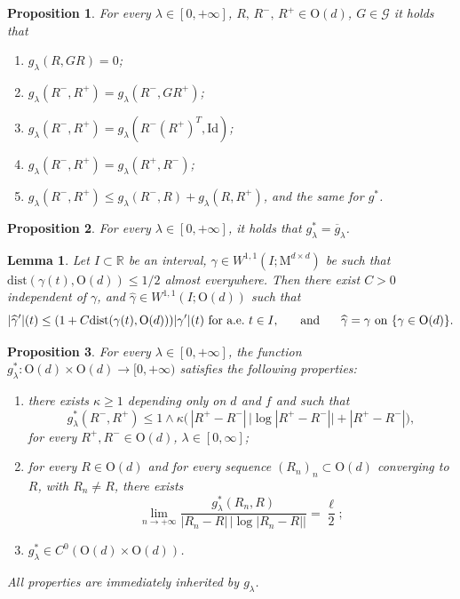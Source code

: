 \documentclass[10pt,a4paper]{amsart}
\newtheorem{proposition}{Proposition}
\newtheorem{lemma}{Lemma}
\newcommand{\G}{\mathcal{G}}
\newcommand\Id{{\mathrm{Id}}}
\newcommand{\Mno}{\mathrm{M}^{d\times d}}
\newcommand{\On}{\mathrm{O}(d)}
\newcommand\R{\mathbb{R}}
\newcommand\dist{{\mathrm{dist}}}
\newcommand{\ol}{\overline}
\begin{document}
\begin{proposition}\label{p:bpg}
For every $\lambda\in [0,+\infty]$,  $R,\,  R^-,\, R^+ \in \On$, $G\in \G$ it holds that 
\begin{enumerate}
	\item\label{p:bpg:0} $g_\lambda(R, GR)=0$;
	\item\label{p:bpg:G} $g_\lambda( R^-, R^+)=g_\lambda( R^-, GR^+)$;
	\item\label{p:bpg:Id} $g_\lambda( R^-, R^+)=g_\lambda( R^-(R^+)^T, \Id)$;
\item\label{p:bpg:sym} $g_\lambda( R^-, R^+)=g_\lambda(R^+, R^-)$;
\item\label{p:bpg:subadd} $g_\lambda( R^-,R^+)
    \le g_\lambda(R^-, R)+g_\lambda(R,R^+)$, and the same for $g^*$.
\end{enumerate}
\end{proposition}

\begin{proposition}\label{le:equivglambda}
For every $\lambda \in[0,+\infty]$, it holds that $g^*_\lambda=\ol g_\lambda$.
\end{proposition}

\begin{lemma}\label{lemmaprojOn}
 Let $I\subset\R$ be an interval, $\gamma\in W^{1,1}(I;\Mno)$ be such that
 $\dist(\gamma(t),\On)\le 1/2$ almost everywhere.
 Then there exist $C>0$ independent of $\gamma$, and  $\widehat\gamma\in W^{1,1}(I;\On)$
 such that
 \begin{equation}
  |\widehat\gamma'|(t)\le (1+C\dist(\gamma(t),\On)) |\gamma'|(t)\ \text{for a.e.}\ t\in I,\hskip5mm
  \text{ and }\hskip5mm
  \widehat\gamma=\gamma \text{ on } \{\gamma\in \On\}.
 \end{equation}
\end{lemma}

\begin{proposition}\label{prop:proprietag}
For every $\lambda\in [0,+\infty]$, the function $ g^*_\lambda \colon \On \times \On \to [0,+\infty)$ satisfies the following properties:
\begin{enumerate}
\item\label{prop:proprietag:upperbound}  there exists $\kappa \geq 1$ depending only on $d$ and $f$ and such that
	\begin{equation}\label{0105232216}
		g^*_\lambda( R^-, R^+) \leq 1 \wedge  \kappa  \Big(\, | R^+- R^-| \,\big|\log | R^+ - R^-|\big| +| R^+ - R^-|\Big),
	\end{equation}
	for every $ R^+,  R^- \in \On$, $\lambda\in [0,\infty]$;

\item\label{prop:proprietag:RS}  for every $R\in\On$ and for every sequence   $(R_n)_n \subset \On $  converging to  $R$, with $R_n \neq R$, there exists
	\[\lim_{n \to +\infty} \frac{g^*_\lambda(R_n, R)}{|R_n-R| \,\big|\log |R_n-R|\big|}=\frac{\ell}{2};
	\]
\item\label{prop:proprietag:C0}  $g^*_\lambda \in C^0(\On\times \On)$.
\end{enumerate}
All properties are immediately inherited by $g_\lambda$.
\end{proposition}
\end{document}
